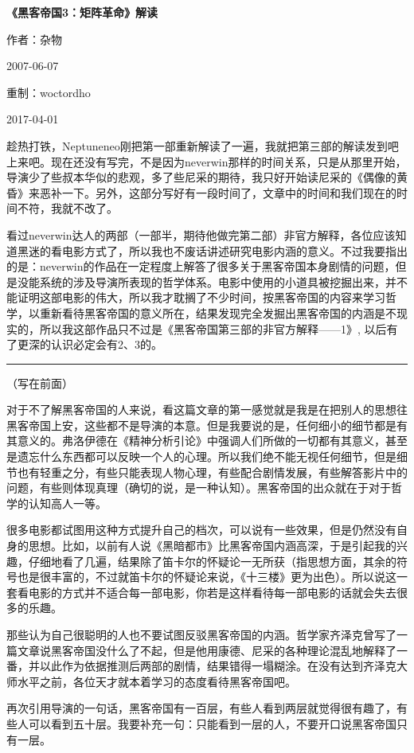 \documentclass[UTF8]{ctexart}
\newcommand{\myparsep}{\noindent \rule[0.5ex]{\linewidth}{1pt}}
\begin{document}
\centerline{\bf \fontsize{15.75pt} \baselineskip \selectfont《黑客帝国3：矩阵革命》解读}
\vspace{12pt}
\centerline{作者：杂物}
\centerline{2007-06-07}
\centerline{重制：woctordho}
\centerline{2017-04-01}
\vspace{12pt}

趁热打铁，Neptuneneo刚把第一部重新解读了一遍，我就把第三部的解读发到吧上来吧。现在还没有写完，不是因为neverwin那样的时间关系，只是从那里开始，导演少了些叔本华似的悲观，多了些尼采的期待，我只好开始读尼采的《偶像的黄昏》来恶补一下。另外，这部分写好有一段时间了，文章中的时间和我们现在的时间不符，我就不改了。

看过neverwin达人的两部（一部半，期待他做完第二部）非官方解释，各位应该知道黑迷的看电影方式了，所以我也不废话讲述研究电影内涵的意义。不过我要指出的是：neverwin的作品在一定程度上解答了很多关于黑客帝国本身剧情的问题，但是没能系统的涉及导演所表现的哲学体系。电影中使用的小道具被挖掘出来，并不能证明这部电影的伟大，所以我才耽搁了不少时间，按黑客帝国的内容来学习哲学，以重新看待黑客帝国的意义所在，结果发现完全发掘出黑客帝国的内涵是不现实的，所以我这部作品只不过是《黑客帝国第三部的非官方解释——1》, 以后有了更深的认识必定会有2、3的。

\myparsep

（写在前面）

对于不了解黑客帝国的人来说，看这篇文章的第一感觉就是我是在把别人的思想往黑客帝国上安，这些都不是导演的本意。但是我要说的是，任何细小的细节都是有其意义的。弗洛伊德在《精神分析引论》中强调人们所做的一切都有其意义，甚至是遗忘什么东西都可以反映一个人的心理。所以我们绝不能无视任何细节，但是细节也有轻重之分，有些只能表现人物心理，有些配合剧情发展，有些解答影片中的问题，有些则体现真理（确切的说，是一种认知）。黑客帝国的出众就在于对于哲学的认知高人一等。

很多电影都试图用这种方式提升自己的档次，可以说有一些效果，但是仍然没有自身的思想。比如，以前有人说《黑暗都市》比黑客帝国内涵高深，于是引起我的兴趣，仔细地看了几遍，结果除了笛卡尔的怀疑论一无所获（指思想方面，其余的符号也是很丰富的，不过就笛卡尔的怀疑论来说，《十三楼》更为出色）。所以说这一套看电影的方式并不适合每一部电影，你若是这样看待每一部电影的话就会失去很多的乐趣。

那些认为自己很聪明的人也不要试图反驳黑客帝国的内涵。哲学家齐泽克曾写了一篇文章说黑客帝国没什么了不起，但是他用康德、尼采的各种理论混乱地解释了一番，并以此作为依据推测后两部的剧情，结果错得一塌糊涂。在没有达到齐泽克大师水平之前，各位天才就本着学习的态度看待黑客帝国吧。

再次引用导演的一句话，黑客帝国有一百层，有些人看到两层就觉得很有趣了，有些人可以看到五十层。我要补充一句：只能看到一层的人，不要开口说黑客帝国只有一层。
\end{document}

